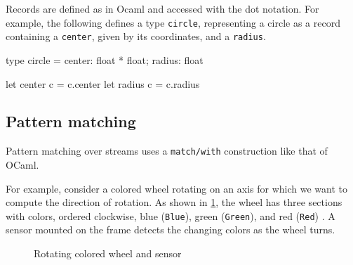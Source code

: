 \documentclass[11pt,titlepage,twoside]{report}
\makeatletter
\newcommand{\zls}[1]{{\@span{class="zelusinline"}#1}}
\newcommand{\zls}[1]{\texttt{#1}}
\renewcommand{\zls}[1]{\texttt{#1}}
\newcommand{\ocaml}{{\sf OCaml}}
\makeatother
\begin{document}
Records are defined as in Ocaml and accessed with the dot notation. For 
example,
the following defines a type \zls{circle}, representing a circle as a record 
containing a \zls{center}, given by its coordinates, and a \zls{radius}.
\begin{chklisting}
type circle = { center: float * float; radius: float }

let center c = c.center
let radius c = c.radius
\end{chklisting}
  
\subsection{Pattern matching\label{patternmatch}} %

Pattern matching over streams uses a \zls{match/with} construction like that 
of \ocaml.

For example, consider a colored wheel rotating on an axis for which we want 
to compute the direction of rotation.
As shown in \cref{colorwheel}, the wheel has three sections with colors, 
ordered clockwise, blue (\zls{Blue}), green (\zls{Green}), and red 
(\zls{Red}) .
A sensor mounted on the frame detects the changing colors as the wheel 
turns.

\begin{figure}[t]
\centering%
\caption{Rotating colored wheel and sensor\label{colorwheel}}
\end{figure}
\end{document}

